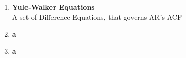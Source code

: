 \documentclass[10pt,landscape]{article}
\begin{document}
\begin{multicols}{3}
\begin{enumerate}
  \item \textbf{Yule-Walker Equations}\\
  		A set of Difference Equations, that governs AR's ACF\\
  		
  \item \textbf{a}\\
  \item \textbf{a}\\
\end{enumerate}

\end{multicols}

\end{document}
